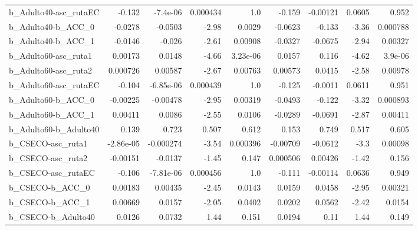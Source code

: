 \begin{tabular}{lrrrrrrrr}
b\_Adulto40-asc\_rutaEC      &      -0.132 &     -7.4e-06 &  0.000434 &      1.0 &     -0.159 &    -0.00121 &       0.0605 &         0.952 \\
b\_Adulto40-b\_ACC\_0         &     -0.0278 &      -0.0503 &     -2.98 &   0.0029 &    -0.0623 &      -0.133 &        -3.36 &      0.000788 \\
b\_Adulto40-b\_ACC\_1         &     -0.0146 &       -0.026 &     -2.61 &  0.00908 &    -0.0327 &     -0.0675 &        -2.94 &       0.00327 \\
b\_Adulto60-asc\_ruta1       &     0.00173 &       0.0148 &     -4.66 & 3.23e-06 &     0.0157 &       0.116 &        -4.62 &       3.9e-06 \\
b\_Adulto60-asc\_ruta2       &    0.000726 &      0.00587 &     -2.67 &  0.00763 &    0.00573 &      0.0415 &        -2.58 &       0.00978 \\
b\_Adulto60-asc\_rutaEC      &      -0.104 &    -6.85e-06 &  0.000439 &      1.0 &     -0.125 &     -0.0011 &       0.0611 &         0.951 \\
b\_Adulto60-b\_ACC\_0         &    -0.00225 &     -0.00478 &     -2.95 &  0.00319 &    -0.0493 &      -0.122 &        -3.32 &      0.000893 \\
b\_Adulto60-b\_ACC\_1         &     0.00411 &       0.0086 &     -2.55 &   0.0106 &    -0.0289 &     -0.0691 &        -2.87 &       0.00411 \\
b\_Adulto60-b\_Adulto40      &       0.139 &        0.723 &     0.507 &    0.612 &      0.153 &       0.749 &        0.517 &         0.605 \\
b\_CSECO-asc\_ruta1          &   -2.86e-05 &    -0.000274 &     -3.54 & 0.000396 &   -0.00709 &     -0.0612 &         -3.3 &       0.00098 \\
b\_CSECO-asc\_ruta2          &    -0.00151 &      -0.0137 &     -1.45 &    0.147 &   0.000506 &     0.00426 &        -1.42 &         0.156 \\
b\_CSECO-asc\_rutaEC         &      -0.106 &    -7.81e-06 &  0.000456 &      1.0 &     -0.111 &    -0.00114 &       0.0636 &         0.949 \\
b\_CSECO-b\_ACC\_0            &     0.00183 &      0.00435 &     -2.45 &   0.0143 &     0.0159 &      0.0458 &        -2.95 &       0.00321 \\
b\_CSECO-b\_ACC\_1            &     0.00669 &       0.0157 &     -2.05 &   0.0402 &     0.0202 &      0.0562 &        -2.42 &        0.0154 \\
b\_CSECO-b\_Adulto40         &      0.0126 &       0.0732 &      1.44 &    0.151 &     0.0194 &        0.11 &         1.44 &         0.149 \\

\end{tabular}
